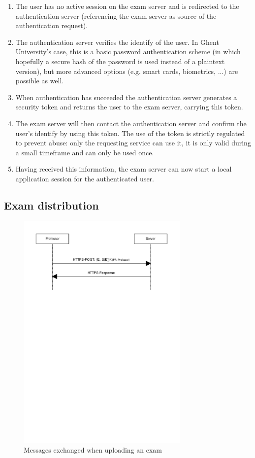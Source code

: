 \documentclass{article}
\begin{document}
\begin{enumerate}
\item The user has no active session on the exam server and is redirected
  to the authentication server (referencing the exam server as source of the
  authentication request).
\item The authentication server verifies the identify of the user. In Ghent
  University's case, this is a basic password authentication scheme (in which
  hopefully a secure hash of the password is used instead of a plaintext
  version), but more advanced options (e.g. smart cards, biometrics, ...) are
  possible as well.
\item When authentication has succeeded the authentication server generates
  a security token and returns the user to the exam server, carrying this token.
\item The exam server will then contact the authentication server and confirm
  the user's identify by using this token. The use of the token is strictly
  regulated to prevent abuse: only the requesting service can use it, it is only
  valid during a small timeframe and can only be used once.
\item Having received this information, the exam server can now start a local
  application session for the authenticated user.
\end{enumerate}

\subsection{Exam distribution}
\label{subsec:impl-exams}

\begin{figure}
  \begin{center}
  \includegraphics[width=0.75\textwidth]{images/upload_exam.pdf}
  \caption{Messages exchanged when uploading an exam}
  \label{fig:upload)exam}
  \end{center}
\end{figure}
\end{document}
